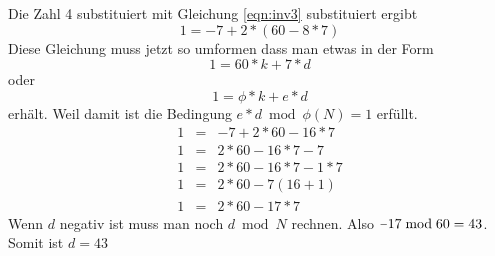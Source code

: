 Die Zahl 4 substituiert mit Gleichung \ref{eqn:inv3} substituiert ergibt
\begin{equation}
1 = -7 + 2*(60-8*7)
\end{equation}
Diese Gleichung muss jetzt so umformen dass man etwas in der Form
\begin{equation*}
1 = 60*k + 7*d
\end{equation*}
oder
\begin{equation*}
1 = \phi*k + e*d
\end{equation*}
erhält. Weil damit ist die Bedingung $e*d \bmod \phi(N) = 1$ erfüllt.
\begin{eqnarray}
1 & = & -7 + 2*60-16*7 \\
1 & = & 2 * 60-16*7-7 \\
1 & = & 2 * 60-16*7-1*7\\
1 & = & 2 * 60-7(16+1)\\
1 & = & 2 * 60-17*7
\end{eqnarray}
Wenn $d$ negativ ist muss man noch $d \bmod N$ rechnen. Also $\unaryminus 17
\bmod 60 = 43$.  Somit ist $d = 43$
